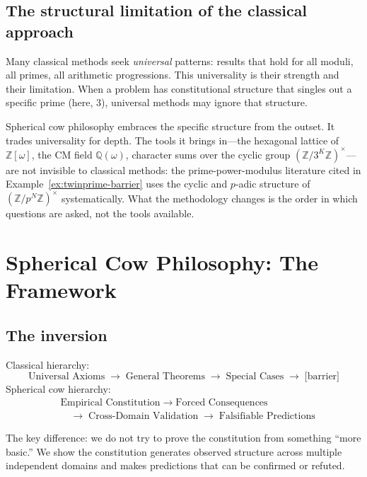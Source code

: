 \documentclass[12pt]{amsart}
\theoremstyle{plain}
\theoremstyle{definition}
\theoremstyle{remark}
\begin{document}
\subsection{The structural limitation of the classical approach}
\label{sec:limitation}

Many classical methods seek \emph{universal} patterns: results that hold for all
moduli, all primes, all arithmetic progressions. This universality is their
strength and their limitation. When a problem has constitutional structure that
singles out a specific prime (here, $3$), universal methods may ignore that
structure.

Spherical cow philosophy embraces the specific structure from the outset. It
trades universality for depth. The tools it brings in---the hexagonal lattice
of $\mathbb{Z}[\omega]$, the CM field $\mathbb{Q}(\omega)$, character sums over
the cyclic group $(\mathbb{Z}/3^K\mathbb{Z})^\times$---are not invisible to
classical methods: the prime-power-modulus literature cited in
Example~\ref{ex:twinprime-barrier} uses the cyclic and $p$-adic structure of
$(\mathbb{Z}/p^N\mathbb{Z})^\times$ systematically. What the methodology changes
is the order in which questions are asked, not the tools available.

\section{Spherical Cow Philosophy: The Framework}

\subsection{The inversion}

Classical hierarchy:
\[
\text{Universal Axioms}
\;\longrightarrow\;
\text{General Theorems}
\;\longrightarrow\;
\text{Special Cases}
\;\longrightarrow\;
\text{[barrier]}
\]
Spherical cow hierarchy:
\begin{align*}
&\text{Empirical Constitution}
\;\longrightarrow\;
\text{Forced Consequences}\\
&\quad\longrightarrow\;
\text{Cross-Domain Validation}
\;\longrightarrow\;
\text{Falsifiable Predictions}
\end{align*}

The key difference: we do not try to prove the constitution from something
``more basic.'' We show the constitution generates observed structure across
multiple independent domains and makes predictions that can be confirmed or
refuted.
\end{document}
